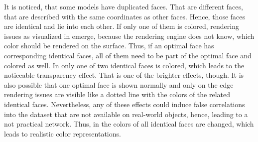 It is noticed, that some models have duplicated faces.
That are different faces, that are described with the same coordinates as other faces.
Hence, those faces are identical and lie into each other.
If only one of them is colored, rendering issues as visualized in  emerge, because the rendering engine does not know, which color should be rendered on the surface.
Thus, if an optimal face has corresponding identical faces, all of them need to be part of the optimal face and colored as well.
In  only one of two identical faces is colored, which leads to the noticeable transparency effect.
That is one of the brighter effects, though.
It is also possible that one optimal face is shown normally and only on the edge rendering issues are visible like a dotted line with the colors of the related identical faces. 
Nevertheless, any of these effects could induce false correlations into the dataset that are not available on real-world objects, hence, leading to a not practical network.
Thus, in  the colors of all identical faces are changed, which leads to realistic color representations.
